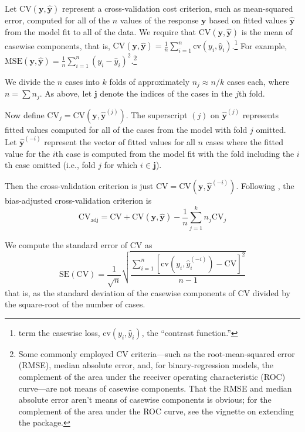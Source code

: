 \documentclass[
]{jss}
\begin{document}
Let \(\mathrm{CV}(\mathbf{y}, \widehat{\mathbf{y}})\) represent a
cross-validation cost criterion, such as mean-squared error, computed
for all of the \(n\) values of the response \(\mathbf{y}\) based on
fitted values \(\widehat{\mathbf{y}}\) from the model fit to all of the
data. We require that \(\mathrm{CV}(\mathbf{y}, \widehat{\mathbf{y}})\)
is the mean of casewise components, that is,
\(\mathrm{CV}(\mathbf{y}, \widehat{\mathbf{y}}) = \frac{1}{n}\sum_{i=1}^n\mathrm{cv}(y_i, \widehat{y}_i)\).\footnote{\citet{ArlotCelisse:2010}
  term the casewise loss, \(\mathrm{cv}(y_i, \widehat{y}_i)\), the
  ``contrast function.''} For example,
\(\mathrm{MSE}(\mathbf{y}, \widehat{\mathbf{y}}) = \frac{1}{n}\sum_{i=1}^n (y_i - \widehat{y}_i)^2\).\footnote{Some
  commonly employed CV criteria---such as the root-mean-squared error
  (RMSE), median absolute error, and, for binary-regression models, the
  complement of the area under the receiver operating characteristic
  (ROC) curve---are not means of casewise components. That the RMSE and
  median absolute error aren't means of casewise components is obvious;
  for the complement of the area under the ROC curve, see the vignette
  on extending the  package.}

We divide the \(n\) cases into \(k\) folds of approximately
\(n_j \approx n/k\) cases each, where \(n = \sum n_j\). As above, let
\(\mathbf{j}\) denote the indices of the cases in the \(j\)th fold.

Now define
\(\mathrm{CV}_j = \mathrm{CV}(\mathbf{y}, \widehat{\mathbf{y}}^{(j)})\).
The superscript \((j)\) on \(\widehat{\mathbf{y}}^{(j)}\) represents
fitted values computed for all of the cases from the model with fold
\(j\) omitted. Let \(\widehat{\mathbf{y}}^{(-i)}\) represent the vector
of fitted values for all \(n\) cases where the fitted value for the
\(i\)th case is computed from the model fit with the fold including the
\(i\)th case omitted (i.e., fold \(j\) for which \(i \in \mathbf{j}\)).

Then the cross-validation criterion is just
\(\mathrm{CV} = \mathrm{CV}(\mathbf{y}, \widehat{\mathbf{y}}^{(-i)})\).
Following \citet[pp.~293--295]{DavisonHinkley:1997}, the bias-adjusted
cross-validation criterion is \[
\mathrm{CV}_{\mathrm{adj}} = \mathrm{CV} + \mathrm{CV}(\mathbf{y}, \widehat{\mathbf{y}}) - \frac{1}{n} \sum_{j=1}^{k} n_j \mathrm{CV}_j
\]

We compute the standard error of CV as \[
\mathrm{SE}(\mathrm{CV}) = \frac{1}{\sqrt n} \sqrt{ \frac{\sum_{i=1}^n \left[ \mathrm{cv}(y_i, \widehat{y}_i^{(-i)} ) - \mathrm{CV} \right]^2 }{n - 1} }
\] that is, as the standard deviation of the casewise components of CV
divided by the square-root of the number of cases.
\end{document}
